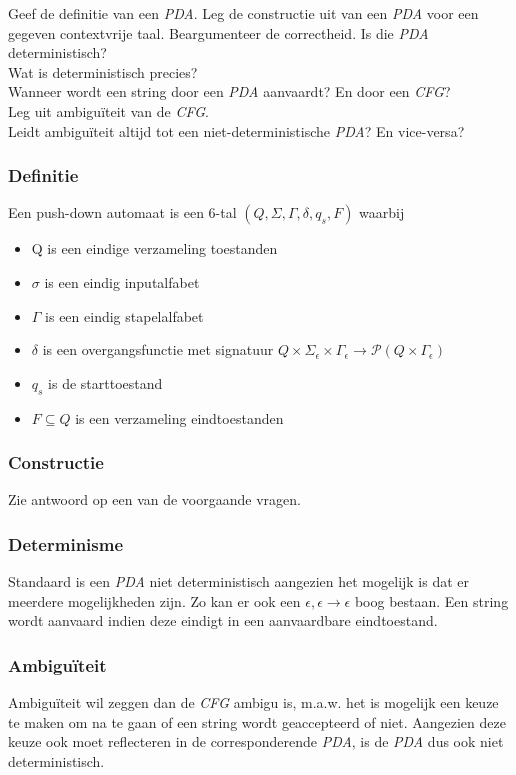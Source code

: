 \begin{quest}
  Geef de definitie van een \emph{PDA}. Leg de constructie uit van een \emph{PDA} voor een gegeven contextvrije taal. Beargumenteer de correctheid.
  Is die \emph{PDA} deterministisch?\\
  Wat is deterministisch precies?\\
  Wanneer wordt een string door een \emph{PDA} aanvaardt? En door een \emph{CFG}?\\
  Leg uit ambigu\"iteit van de \emph{CFG}.\\
  Leidt ambigu\"iteit altijd tot een niet-deterministische \emph{PDA}? En vice-versa?
\end{quest}

\subsubsection*{Definitie}

\begin{theorem}
  Een push-down automaat is een 6-tal $(Q,\Sigma, \Gamma, \delta, q_s, F)$ waarbij
  \begin{itemize}
    \item Q is een eindige verzameling toestanden
    \item $\sigma$ is een eindig inputalfabet
    \item $\Gamma$ is een eindig stapelalfabet
    \item $\delta$ is een overgangsfunctie met signatuur $Q \times \Sigma_\epsilon \times \Gamma_\epsilon \rightarrow \mathcal{P}(Q \times \Gamma_\epsilon)$
    \item $q_s$ is de starttoestand
    \item $F \subseteq Q$ is een verzameling eindtoestanden
  \end{itemize}
\end{theorem}

\subsubsection*{Constructie}

Zie antwoord op een van de voorgaande vragen.

\subsubsection*{Determinisme}

Standaard is een \emph{PDA} niet deterministisch aangezien het mogelijk is dat er meerdere mogelijkheden zijn. Zo kan er ook een $\epsilon, \epsilon \rightarrow \epsilon$ boog bestaan. Een string wordt aanvaard indien deze eindigt in een aanvaardbare eindtoestand.

\subsubsection*{Ambigu\"iteit}

Ambigu\"iteit wil zeggen dan de \emph{CFG} ambigu is, m.a.w. het is mogelijk een keuze te maken om na te gaan of een string wordt geaccepteerd of niet. Aangezien deze keuze ook moet reflecteren in de corresponderende \emph{PDA}, is de \emph{PDA} dus ook niet deterministisch.
